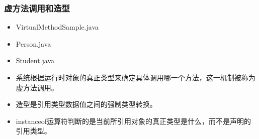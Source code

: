 \begin{frame}[fragile]
  \frametitle{虚方法调用和造型}


  \begin{itemize}\small
  \item VirtualMethodSample.java
  \item Person.java
  \item Student.java
  \end{itemize}
  
  
  \begin{itemize}[<+-| alert@+>]
  \item 系统根据运行时对象的真正类型来确定具体调用哪一个方法，这一机制被称为
    {\hei\Blue 虚方法调用}。
  \item 造型是引用类型数据值之间的强制类型转换。
  \item instanceof运算符判断的是当前所引用对象的真正类型是什么，而不是声明的引用类型。
  \end{itemize}
\end{frame}

%
%

